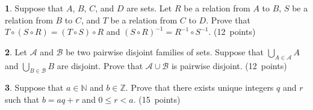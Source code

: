 \documentclass[12pt,a4paper]{article}
\theoremstyle{definition}
\newtheorem{Ex}{}
\begin{document}
\begin{Ex}
Suppose that $A$, $B$, $C$, and $D$ are sets. Let $R$ be a relation from $A$ to $B$, $S$ be a relation from $B$ to $C$, and $T$ be a relation from $C$ to $D$. Prove that $T\circ(S\circ R) = (T\circ S)\circ R$ and $(S\circ R)^{-1} = R^{-1} \circ S^{-1}$. \quad (12~points)
\end{Ex}

\begin{Ex}
Let $\mathcal{A}$ and $\mathcal{B}$ be two pairwise disjoint families of sets. Suppose that $\bigcup_{A\in\mathcal{A}}A$ and $\bigcup_{B\in\mathcal{B}}B$ are disjoint. Prove that $\mathcal{A}\cup\mathcal{B}$ is pairwise disjoint. \quad (12~points)
\end{Ex}

\begin{Ex}
Suppose that $a\in\mathbb{N}$ and $b\in\mathbb{Z}$. Prove that there exists unique integers $q$ and $r$ such that $b=aq+r$ and $0\le r < a$. \quad (15~points)
\end{Ex}
\end{document}
